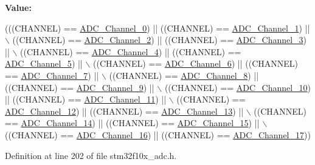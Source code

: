 {\bfseries Value\+:}
\begin{DoxyCode}
(((CHANNEL) == \hyperlink{group___a_d_c__channels_ga40ec353803e9470a5721ef5bf0b1ab24}{ADC\_Channel\_0}) || ((CHANNEL) == \hyperlink{group___a_d_c__channels_ga0b04cebf8d62085eca6dc7daa3d5d3f0}{ADC\_Channel\_1}) || \(\backslash\)
                                 ((CHANNEL) == \hyperlink{group___a_d_c__channels_gabc66e2529583e11b591efd2df7070571}{ADC\_Channel\_2}) || ((CHANNEL) == 
      \hyperlink{group___a_d_c__channels_ga9f93cbacd030f1c79f96f8889b0cdee6}{ADC\_Channel\_3}) || \(\backslash\)
                                 ((CHANNEL) == \hyperlink{group___a_d_c__channels_gafc7218417f729659dd8f06185cc2eafa}{ADC\_Channel\_4}) || ((CHANNEL) == 
      \hyperlink{group___a_d_c__channels_ga42822abae41faabde2a2da877e0cc854}{ADC\_Channel\_5}) || \(\backslash\)
                                 ((CHANNEL) == \hyperlink{group___a_d_c__channels_ga7e24a73eec4aeb7d8e2f9008825ceacb}{ADC\_Channel\_6}) || ((CHANNEL) == 
      \hyperlink{group___a_d_c__channels_ga9723aa5fe6b9f4af1ffd3b90e6eef8d1}{ADC\_Channel\_7}) || \(\backslash\)
                                 ((CHANNEL) == \hyperlink{group___a_d_c__channels_ga99b2c662d4068152e0e80a048036cc48}{ADC\_Channel\_8}) || ((CHANNEL) == 
      \hyperlink{group___a_d_c__channels_ga01a61c428be0cb69327e428e32a42aa1}{ADC\_Channel\_9}) || \(\backslash\)
                                 ((CHANNEL) == \hyperlink{group___a_d_c__channels_gabfa98b580f49a82a83dcb1df32efceca}{ADC\_Channel\_10}) || ((CHANNEL) == 
      \hyperlink{group___a_d_c__channels_ga5bfc40d938f384f22665f6e2dd945cfd}{ADC\_Channel\_11}) || \(\backslash\)
                                 ((CHANNEL) == \hyperlink{group___a_d_c__channels_gaa1e35f7870ae8f05013a681293175299}{ADC\_Channel\_12}) || ((CHANNEL) == 
      \hyperlink{group___a_d_c__channels_ga517cda911256f722eb067d7140663230}{ADC\_Channel\_13}) || \(\backslash\)
                                 ((CHANNEL) == \hyperlink{group___a_d_c__channels_gaf1830a03fe4a3820fde4f41ba907c394}{ADC\_Channel\_14}) || ((CHANNEL) == 
      \hyperlink{group___a_d_c__channels_ga01431a7b4e388beb241328874abdf88c}{ADC\_Channel\_15}) || \(\backslash\)
                                 ((CHANNEL) == \hyperlink{group___a_d_c__channels_ga52fb09ae9a0333a0e071da106466c659}{ADC\_Channel\_16}) || ((CHANNEL) == 
      \hyperlink{group___a_d_c__channels_ga58cdfe3a5625f198116d163b09698cea}{ADC\_Channel\_17}))
\end{DoxyCode}


Definition at line 202 of file stm32f10x\+\_\+adc.\+h.

